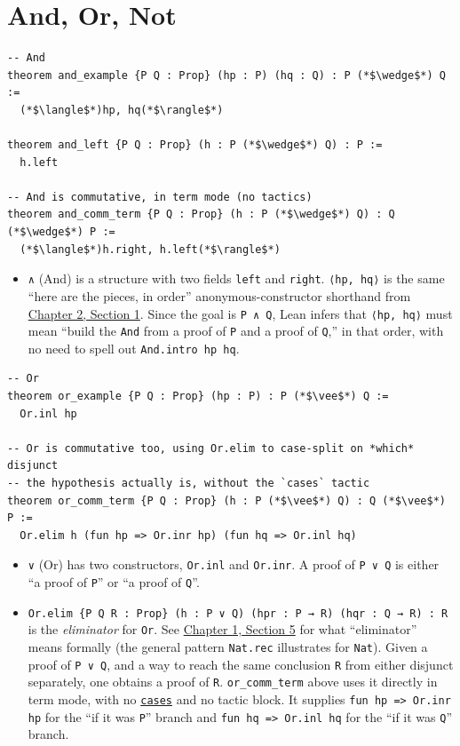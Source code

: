 \section{And, Or, Not}\label{sec:03-propositions-and-proofs:05-and-or-not:1}

\begin{lstlisting}
-- And
theorem and_example {P Q : Prop} (hp : P) (hq : Q) : P (*$\wedge$*) Q :=
  (*$\langle$*)hp, hq(*$\rangle$*)

theorem and_left {P Q : Prop} (h : P (*$\wedge$*) Q) : P :=
  h.left

-- And is commutative, in term mode (no tactics)
theorem and_comm_term {P Q : Prop} (h : P (*$\wedge$*) Q) : Q (*$\wedge$*) P :=
  (*$\langle$*)h.right, h.left(*$\rangle$*)
\end{lstlisting}

\begin{itemize}
\tightlist
\item
  \texttt{∧} (And) is a structure with two fields \texttt{left} and \texttt{right}. \texttt{⟨hp, hq⟩} is the same ``here are the pieces, in order'' anonymous-constructor shorthand from \hyperref[sec:02-functions-and-structures:01-structure-basics:1]{Chapter 2, Section 1}. Since the goal is \texttt{P ∧ Q}, Lean infers that \texttt{⟨hp, hq⟩} must mean ``build the \texttt{And} from a proof of \texttt{P} and a proof of \texttt{Q},'' in that order, with no need to spell out \texttt{And.intro hp hq}.
\end{itemize}

\begin{lstlisting}
-- Or
theorem or_example {P Q : Prop} (hp : P) : P (*$\vee$*) Q :=
  Or.inl hp

-- Or is commutative too, using Or.elim to case-split on *which* disjunct
-- the hypothesis actually is, without the `cases` tactic
theorem or_comm_term {P Q : Prop} (h : P (*$\vee$*) Q) : Q (*$\vee$*) P :=
  Or.elim h (fun hp => Or.inr hp) (fun hq => Or.inl hq)
\end{lstlisting}

\begin{itemize}
\tightlist
\item
  \texttt{∨} (Or) has two constructors, \texttt{Or.inl} and \texttt{Or.inr}. A proof of \texttt{P ∨ Q} is either ``a proof of \texttt{P}'' or ``a proof of \texttt{Q}''.
\item
  \texttt{Or.elim \{P Q R : Prop\} (h : P ∨ Q) (hpr : P → R) (hqr : Q → R) : R} is the \emph{eliminator} for \texttt{Or}. See \hyperref[sec:01-basics:05-pi-sigma-and-coc:1]{Chapter 1, Section 5} for what ``eliminator'' means formally (the general pattern \texttt{Nat.rec} illustrates for \texttt{Nat}). Given a proof of \texttt{P ∨ Q}, and a way to reach the same conclusion \texttt{R} from either disjunct separately, one obtains a proof of \texttt{R}. \texttt{or\_\allowbreak{}comm\_\allowbreak{}term} above uses it directly in term mode, with no \href{https://lean-lang.org/doc/reference/latest/Tactic-Proofs/Tactic-Reference/}{\texttt{cases}} and no tactic block. It supplies \texttt{fun hp => Or.inr hp} for the ``if it was \texttt{P}'' branch and \texttt{fun hq => Or.inl hq} for the ``if it was \texttt{Q}'' branch.
\end{itemize}

